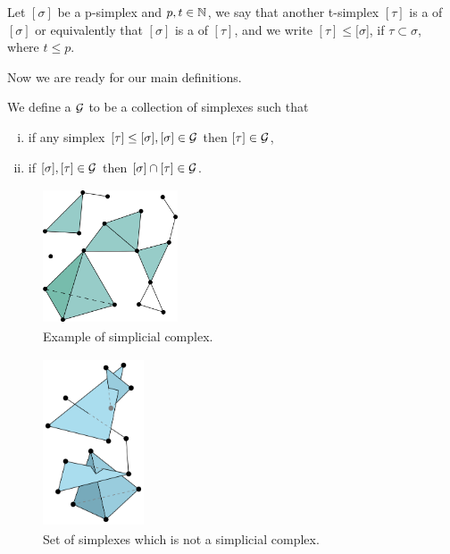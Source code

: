 \documentclass[../1.tex]{subfiles}
\begin{document}
    \begin{defn}
        Let $[\sigma]$ be a p-simplex and $p,t \in \mathbb{N}$, we say that another t-simplex $[\tau]$ is a  of $[\sigma]$ or equivalently 
        that $[\sigma]$ is a  of $[\tau]$, and we write $[\tau] \leq [\sigma$], if $\tau \subset \sigma$, where $t \leq p$.
    \end{defn}

    Now we are ready for our main definitions.
    
    \begin{defn}
        We define a  $\mathcal{G}$ to be a collection of simplexes such that
        \begin{enumerate}[(i)]
            \item if any simplex $ [\tau] \leq [\sigma], [\sigma] \in \mathcal{G}$ then $ [\tau] \in \mathcal{G}$,
            \item if $ [\sigma], [\tau] \in \mathcal{G}$ then $[\sigma] \cap [\tau] \in \mathcal{G}$.
        \end{enumerate}
    \end{defn}

    
    \begin{figure}[h]
        \centering
        \includegraphics[width=4cm, height=4cm]{sections/1/complex}
        \caption{Example of simplicial complex.}
        \label{fig:1}
    \end{figure} 

    \begin{figure}[h]
        \centering
        \includegraphics[width=3cm, height=5cm]{sections/1/noncomplex}
        \caption{Set of simplexes which is not a simplicial complex.}
        \label{fig:2}
    \end{figure}
\end{document}
